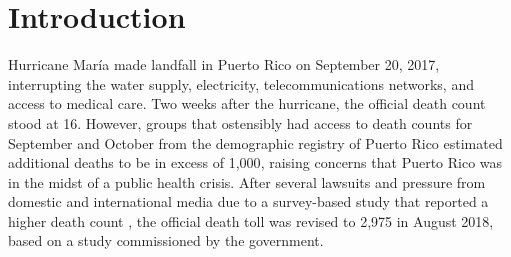 \documentclass[11pt]{article}
\begin{document}
\newpage
\section{Introduction}
\label{sec:introduction}
Hurricane Mar\'ia made landfall in Puerto Rico on September 20, 2017, interrupting the water supply, electricity, telecommunications networks, and access to medical care\cite{updates2018puerto, rogers2017puerto}. Two weeks after the hurricane, the official death count stood at 16\cite{hoyos2018puerto}. However, groups that ostensibly had access to death counts for September and October from the demographic registry of Puerto Rico estimated additional deaths to be in excess of 1,000\cite{santos2018use, robles2017official, rivera2018estimating, pascual2017nearly}, raising concerns that Puerto Rico was in the midst of a public health crisis. After several lawsuits and pressure from domestic and international media due to a survey-based study that reported a higher death count \cite{kishore2018mortality}, the official death toll was revised to 2,975 in August 2018, based on a study commissioned by the government.

\end{document}
